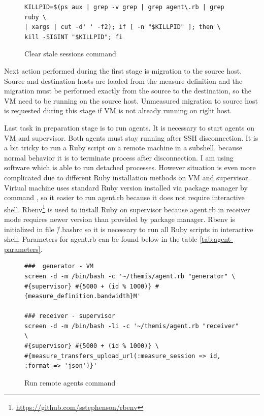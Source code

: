 \begin{figure}[htb]
\caption{Clear stale sessions command}
\label{cmd:killcmd}
\begin{verbatim}
KILLPID=$(ps aux | grep -v grep | grep agent\.rb | grep ruby \
| xargs | cut -d' ' -f2); if [ -n "$KILLPID" ]; then \
kill -SIGINT "$KILLPID"; fi 
\end{verbatim}
\end{figure}

Next action performed during the first stage is migration to the source host. Source and destination hosts are loaded from the measure definition and the migration must be performed exactly from the source to the destination, so the \Ac{VM} need to be running on the source host. Unmeasured migration to source host is requested during this stage if \Ac{VM} is not already running on right host.

Last task in preparation stage is to run agents. It is necessary to start agents on \Ac{VM} and supervisor. Both agents must stay running after \Ac{SSH} disconnection. It is a bit tricky to run a Ruby script on a remote machine in a subshell, because normal behavior it is to terminate process after disconnection. I am using \Cmd{screen} software which is able to run detached processes. However situation is even more complicated due to different Ruby installation methods on \Ac{VM} and supervisor. Virtual machine uses standard Ruby version installed via package manager by command , so it easier to run agent.rb because it does not require interactive shell. Rbenv\footnote{\url{https://github.com/sstephenson/rbenv}} is used to install Ruby on supervisor because agent.rb in receiver mode requires newer version than provided by package manager. Rbenv is initialized in file \~/.bashrc so it is necessary to run all Ruby scripts in interactive shell. Parameters for agent.rb can be found below in the table \ref{tab:agent-parameters}.

\begin{figure}[htb]
\caption{Run remote agents command}
\label{cmd:remote agents}
\begin{verbatim}
###  generator - VM
screen -d -m /bin/bash -c '~/themis/agent.rb "generator" \
#{supervisor} #{5000 + (id % 1000)} #{measure_definition.bandwidth}M'

### receiver - supervisor
screen -d -m /bin/bash -li -c '~/themis/agent.rb "receiver" \
#{supervisor} #{5000 + (id % 1000)} \
#{measure_transfers_upload_url(:measure_session => id, :format => 'json')}'
\end{verbatim}
\end{figure}

